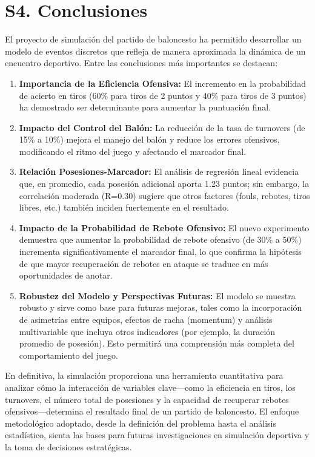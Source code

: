 \documentclass[12pt]{article}
\begin{document}
\section{S4. Conclusiones}
El proyecto de simulación del partido de baloncesto ha permitido desarrollar un modelo de eventos discretos que refleja de manera aproximada la dinámica de un encuentro deportivo. Entre las conclusiones más importantes se destacan:
\begin{enumerate}
    \item \textbf{Importancia de la Eficiencia Ofensiva:} El incremento en la probabilidad de acierto en tiros (60\% para tiros de 2 puntos y 40\% para tiros de 3 puntos) ha demostrado ser determinante para aumentar la puntuación final.
    \item \textbf{Impacto del Control del Balón:} La reducción de la tasa de turnovers (de 15\% a 10\%) mejora el manejo del balón y reduce los errores ofensivos, modificando el ritmo del juego y afectando el marcador final.
    \item \textbf{Relación Posesiones-Marcador:} El análisis de regresión lineal evidencia que, en promedio, cada posesión adicional aporta 1.23 puntos; sin embargo, la correlación moderada (R=0.30) sugiere que otros factores (fouls, rebotes, tiros libres, etc.) también inciden fuertemente en el resultado.
    \item \textbf{Impacto de la Probabilidad de Rebote Ofensivo:} El nuevo experimento demuestra que aumentar la probabilidad de rebote ofensivo (de 30\% a 50\%) incrementa significativamente el marcador final, lo que confirma la hipótesis de que mayor recuperación de rebotes en ataque se traduce en más oportunidades de anotar.
    \item \textbf{Robustez del Modelo y Perspectivas Futuras:} El modelo se muestra robusto y sirve como base para futuras mejoras, tales como la incorporación de asimetrías entre equipos, efectos de racha (momentum) y análisis multivariable que incluya otros indicadores (por ejemplo, la duración promedio de posesión). Esto permitirá una comprensión más completa del comportamiento del juego.
\end{enumerate}
En definitiva, la simulación proporciona una herramienta cuantitativa para analizar cómo la interacción de variables clave---como la eficiencia en tiros, los turnovers, el número total de posesiones y la capacidad de recuperar rebotes ofensivos---determina el resultado final de un partido de baloncesto. El enfoque metodológico adoptado, desde la definición del problema hasta el análisis estadístico, sienta las bases para futuras investigaciones en simulación deportiva y la toma de decisiones estratégicas.
\end{document}
